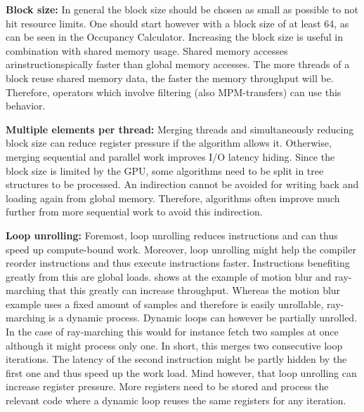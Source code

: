 \documentclass[m,times]{cgMA}
\begin{document}
\textbf{Block size:} In general the block size should be chosen as small as possible to not hit resource limits. One should start however with a block size of at least 64, as can be seen in the Occupancy Calculator. Increasing the block size is useful in combination with shared memory usage. Shared memory accesses arinstructionspically faster than global memory accesses. The more threads of a block reuse shared memory data, the faster the memory throughput will be. Therefore, operators which involve filtering (also MPM-transfers) can use this behavior.

\textbf{Multiple elements per thread:} Merging threads and simultaneously reducing block size can reduce register pressure if the algorithm allows it. Otherwise, merging sequential and parallel work improves I/O latency hiding. Since the block size is limited by the GPU, some algorithms need to be split in tree structures to be processed. An indirection cannot be avoided for writing back and loading again from global memory. Therefore, algorithms often improve much further from more sequential work to avoid this indirection.

\textbf{Loop unrolling:} Foremost, loop unrolling reduces instructions and can thus speed up compute-bound work. Moreover, loop unrolling might help the compiler reorder instructions and thus execute instructions faster. Instructions benefiting greatly from this are global loads. \cite{NVIDIA:PEAK_PERFORMANCE} shows at the example of motion blur and ray-marching that this greatly can increase throughput. Whereas the motion blur example uses a fixed amount of samples and therefore is easily unrollable, ray-marching is a dynamic process. Dynamic loops can however be partially unrolled. In the case of ray-marching this would for instance fetch two samples at once although it might process only one. In short, this merges two consecutive loop iterations. The latency of the second instruction might be partly hidden by the first one and thus speed up the work load. Mind however, that loop unrolling can increase register pressure. More registers need to be stored and process the relevant code where a dynamic loop reuses the same registers for any iteration.

\begin{flushright}\cite{AMD:GPU_OPEN}\cite{NVIDIA:BEST:PRACTICE}\cite{NVIDIA:PEAK_PERFORMANCE}\end{flushright}
\end{document}
